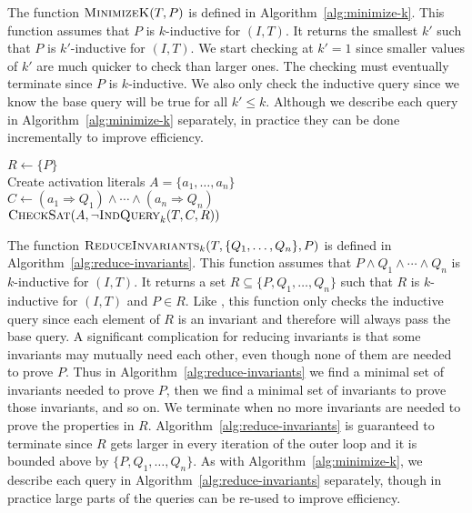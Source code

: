 The function $\textsc{MinimizeK}(T, P)$ is defined in
Algorithm~\ref{alg:minimize-k}. This function assumes that $P$ is
$k$-inductive for $(I, T)$. It returns the smallest $k'$ such that $P$
is $k'$-inductive for $(I, T)$. We start checking at $k' = 1$ since
smaller values of $k'$ are much quicker to check than larger ones. The
checking must eventually terminate since $P$ is $k$-inductive. We also
only check the inductive query since we know the base query will be
true for all $k' \leq k$. Although we describe each query in
Algorithm~\ref{alg:minimize-k} separately, in practice they can be
done incrementally to improve efficiency.

\begin{algorithm}[t]
  $R \leftarrow \{P\}$ \\
  Create activation literals $A = \{a_1, \ldots, a_n\}$ \\
  $C \leftarrow (a_1 \Rightarrow Q_1) \land \cdots \land (a_n \Rightarrow Q_n)$ \\
   {
    $\textsc{CheckSat}(A, \neg\textsc{IndQuery}_k(T, C, R))$ \\
  }
\caption{$\reduceinv_k(T, \{Q_1, \ldots, Q_n\}, P)$}
\label{alg:reduce-invariants}
\end{algorithm}

The function $\reduceinv_k(T, \{Q_1, \ldots, Q_n\}, P)$ is defined in
Algorithm~\ref{alg:reduce-invariants}. This function assumes that $P
\land Q_1 \land \cdots \land Q_n$ is $k$-inductive for $(I, T)$. It
returns a set $R \subseteq \{P, Q_1, \ldots, Q_n\}$ such that $R$ is
$k$-inductive for $(I, T)$ and $P \in R$. Like \mink, this function
only checks the inductive query since each element of $R$ is an
invariant and therefore will always pass the base query. A significant
complication for reducing invariants is that some invariants may
mutually need each other, even though none of them are needed to prove
$P$. Thus in Algorithm~\ref{alg:reduce-invariants} we find a minimal
set of invariants needed to prove $P$, then we find a minimal set of
invariants to prove those invariants, and so on. We terminate when no
more invariants are needed to prove the properties in $R$.
Algorithm~\ref{alg:reduce-invariants} is guaranteed to terminate since
$R$ gets larger in every iteration of the outer loop and it is bounded
above by $\{P, Q_1, \ldots, Q_n\}$. As with
Algorithm~\ref{alg:minimize-k}, we describe each query in
Algorithm~\ref{alg:reduce-invariants} separately, though in practice
large parts of the queries can be re-used to improve efficiency.

